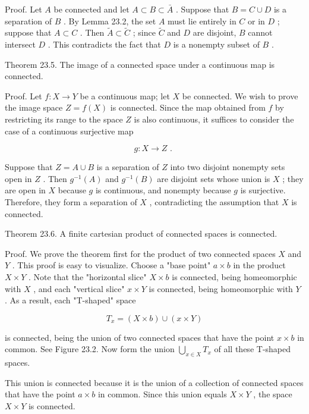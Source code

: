\documentclass[10pt]{article}
\begin{document}
Proof. Let \(A\) be connected and let \(A \subset  B \subset  \bar{A}\) . Suppose that \(B = C \cup  D\) is a separation of \(B\) . By Lemma 23.2, the set \(A\) must lie entirely in \(C\) or in \(D\) ; suppose that \(A \subset  C\) . Then \(\widetilde{A} \subset  \widetilde{C}\) ; since \(\widetilde{C}\) and \(D\) are disjoint, \(B\) cannot intersect \(D\) . This contradicts the fact that \(D\) is a nonempty subset of \(B\) .

Theorem 23.5. The image of a connected space under a continuous map is connected.

Proof. Let \(f : X \rightarrow  Y\) be a continuous map; let \(X\) be connected. We wish to prove the image space \(Z = f\left( X\right)\) is connected. Since the map obtained from \(f\) by restricting its range to the space \(Z\) is also continuous, it suffices to consider the case of a continuous surjective map

\[
g : X \rightarrow  Z\text{ . }
\]

Suppose that \(Z = A \cup  B\) is a separation of \(Z\) into two disjoint nonempty sets open in \(Z\) . Then \({g}^{-1}\left( A\right)\) and \({g}^{-1}\left( B\right)\) are disjoint sets whose union is \(X\) ; they are open in \(X\) because \(g\) is continuous, and nonempty because \(g\) is surjective. Therefore, they form a separation of \(X\) , contradicting the assumption that \(X\) is connected.

Theorem 23.6. A finite cartesian product of connected spaces is connected.

Proof. We prove the theorem first for the product of two connected spaces \(X\) and \(Y\) . This proof is easy to visualize. Choose a "base point" \(a \times  b\) in the product \(X \times  Y\) . Note that the "horizontal slice" \(X \times  b\) is connected, being homeomorphic with \(X\) , and each "vertical slice" \(x \times  Y\) is connected, being homeomorphic with \(Y\) . As a result, each "T-shaped" space

\[
{T}_{x} = \left( {X \times  b}\right)  \cup  \left( {x \times  Y}\right)
\]

is connected, being the union of two connected spaces that have the point \(x \times  b\) in common. See Figure 23.2. Now form the union \(\mathop{\bigcup }\limits_{{x \in  X}}{T}_{x}\) of all these T-shaped spaces.

This union is connected because it is the union of a collection of connected spaces that have the point \(a \times  b\) in common. Since this union equals \(X \times  Y\) , the space \(X \times  Y\) is connected.
\end{document}
